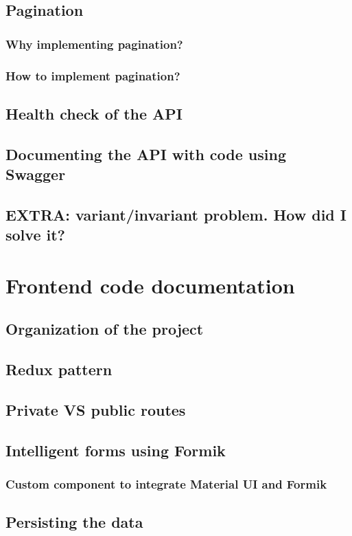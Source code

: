     \subsection{Pagination}
        \subsubsection{Why implementing pagination?}
        \subsubsection{How to implement pagination?}
    \subsection{Health check of the API}
    \subsection{Documenting the API with code using Swagger}
    \subsection{EXTRA: variant/invariant problem. How did I solve it?}

\section{Frontend code documentation}
    \subsection{Organization of the project}
    \subsection{Redux pattern}
    \subsection{Private VS public routes}
    \subsection{Intelligent forms using Formik}
        \subsubsection{Custom component to integrate Material UI and Formik}
    \subsection{Persisting the data}

